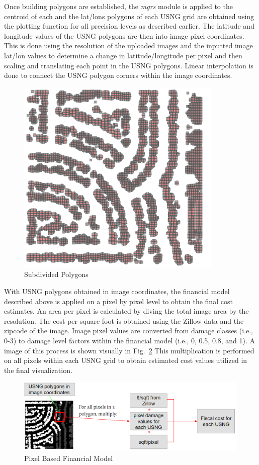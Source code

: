 \documentclass[conference]{IEEEtran}
\begin{document}
Once building polygons are established, the \emph{mgrs} module is applied to the centroid of each and the lat/lons polygons of each USNG grid are obtained using the plotting function for all precision levels as described earlier. The latitude and longitude values of the USNG polygons are then into image pixel coordinates. This is done using the resolution of the uploaded images and the inputted image lat/lon values to determine a change in latitude/longitude per pixel and then scaling and translating each point in the USNG polygons. Linear interpolation is done to connect the USNG polygon corners within the image coordinates. 

\begin{figure}[ht]
\centering\includegraphics[width=0.7\linewidth]{subdividedpolygons.png}
\caption{Subdivided Polygons}
\label{subdivide}
\end{figure}

With USNG polygons obtained in image coordinates, the financial model described above is applied on a pixel by pixel level to obtain the final cost estimates. An area per pixel is calculated by diving the total image area by the resolution. The cost per square foot is obtained using the Zillow data and the zipcode of the image. Image pixel values are converted from damage classes (i.e., 0-3) to damage level factors within the financial model (i.e., 0, 0.5, 0.8, and 1). A image of this process is shown visually in Fig.~\ref{pixelmodel} This multiplication is performed on all pixels within each USNG grid to obtain estimated cost values utilized in the final visualization.

\begin{figure}[h]
\centering\includegraphics[width=1\linewidth]{appmultiply.png}
\caption{Pixel Based Financial Model}
\label{pixelmodel}
\end{figure}
\end{document}
